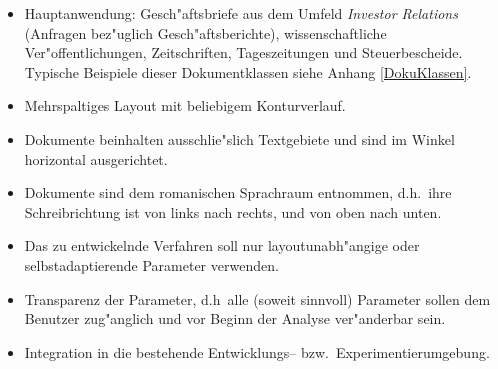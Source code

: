 \begin{itemize}

  \item Hauptanwendung: Gesch"aftsbriefe aus dem Umfeld {\em Investor Relations\/}
        (Anfragen bez"uglich Gesch"aftsberichte), wissenschaftliche 
	Ver"offentlichungen, Zeitschriften, Tageszeitungen und Steuerbescheide.
	Typische Beispiele dieser Dokumentklassen siehe Anhang \ref{DokuKlassen}.

  \item Mehrspaltiges Layout mit beliebigem Konturverlauf.

  \item Dokumente beinhalten ausschlie"slich Textgebiete und sind im Winkel horizontal
  ausgerichtet.
  
  \item Dokumente sind dem romanischen Sprachraum entnommen, d.h.\ ihre Schreibrichtung ist
        von links nach rechts, und von oben nach unten.
  
  \item Das zu entwickelnde Verfahren soll nur layoutunabh"angige oder selbstadaptierende
  Parameter verwenden.
	
  \item Transparenz der Parameter, d.h\ alle (soweit sinnvoll) Parameter sollen dem Benutzer
        zug"anglich und vor Beginn der Analyse ver"anderbar sein.
	
  \item Integration in die bestehende Entwicklungs-- bzw.\ Experimentierumgebung.
  
\end{itemize}
